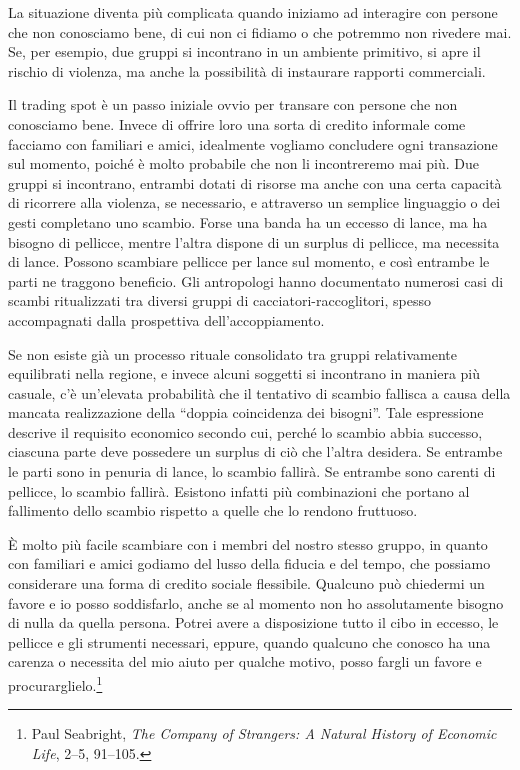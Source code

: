 \documentclass[
  a5paper,
  smalldemyvopaper,10pt,twoside,onecolumn,openright,extrafontsizes,hidelinks]{memoir}
\begin{document}
La situazione diventa più complicata quando iniziamo ad interagire con
persone che non conosciamo bene, di cui non ci fidiamo o che potremmo
non rivedere mai. Se, per esempio, due gruppi si incontrano in un
ambiente primitivo, si apre il rischio di violenza, ma anche la
possibilità di instaurare rapporti commerciali.

Il trading spot è un passo iniziale ovvio per transare con persone che
non conosciamo bene. Invece di offrire loro una sorta di credito
informale come facciamo con familiari e amici, idealmente vogliamo
concludere ogni transazione sul momento, poiché è molto probabile che
non li incontreremo mai più. Due gruppi si incontrano, entrambi dotati
di risorse ma anche con una certa capacità di ricorrere alla violenza,
se necessario, e attraverso un semplice linguaggio o dei gesti
completano uno scambio. Forse una banda ha un eccesso di lance, ma ha
bisogno di pellicce, mentre l'altra dispone di un surplus di pellicce,
ma necessita di lance. Possono scambiare pellicce per lance sul momento,
e così entrambe le parti ne traggono beneficio. Gli antropologi hanno
documentato numerosi casi di scambi ritualizzati tra diversi gruppi di
cacciatori-raccoglitori, spesso accompagnati dalla prospettiva
dell'accoppiamento.

Se non esiste già un processo rituale consolidato tra gruppi
relativamente equilibrati nella regione, e invece alcuni soggetti si
incontrano in maniera più casuale, c'è un'elevata probabilità che il
tentativo di scambio fallisca a causa della mancata realizzazione della
``doppia coincidenza dei bisogni''. Tale espressione descrive il
requisito economico secondo cui, perché lo scambio abbia successo,
ciascuna parte deve possedere un surplus di ciò che l'altra desidera. Se
entrambe le parti sono in penuria di lance, lo scambio fallirà. Se
entrambe sono carenti di pellicce, lo scambio fallirà. Esistono infatti
più combinazioni che portano al fallimento dello scambio rispetto a
quelle che lo rendono fruttuoso.

È molto più facile scambiare con i membri del nostro stesso gruppo, in
quanto con familiari e amici godiamo del lusso della fiducia e del
tempo, che possiamo considerare una forma di credito sociale flessibile.
Qualcuno può chiedermi un favore e io posso soddisfarlo, anche se al
momento non ho assolutamente bisogno di nulla da quella persona. Potrei
avere a disposizione tutto il cibo in eccesso, le pellicce e gli
strumenti necessari, eppure, quando qualcuno che conosco ha una carenza
o necessita del mio aiuto per qualche motivo, posso fargli un favore e
procurarglielo.\footnote{Paul Seabright, \emph{The Company of Strangers:
  A Natural History of Economic Life}, 2--5, 91--105.}
\end{document}
